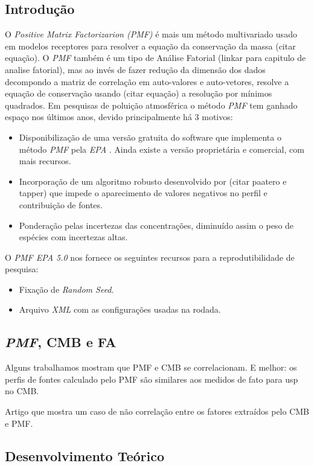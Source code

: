 \subsection{Introdução}
O \textit{Positive Matrix Factorizarion (PMF)} é mais um método multivariado usado em modelos receptores para resolver a equação da conservação da massa (citar equação). O \textit{PMF} também é um tipo de Análise Fatorial (linkar para capitulo de analise fatorial), mas ao invés de fazer redução da dimensão dos dados decompondo a matriz de correlação em auto-valores e auto-vetores, resolve a equação de conservação usando (citar equação) a resolução por mínimos quadrados. Em pesquisas de poluição atmosférica o método \textit{PMF} tem ganhado espaço nos últimos anos, devido principalmente há 3 motivos:

\begin{itemize}
  \item Disponibilização de uma versão gratuita do software que implementa o método \textit{PMF} pela \textit{EPA} \citep{Norris:2014}. Ainda existe a versão proprietária e comercial, com mais recursos.   
  \item Incorporação de um algoritmo robusto desenvolvido por (citar paatero e tapper) que impede o aparecimento de valores negativos no perfil e contribuição de fontes.
  \item Ponderação pelas incertezas das concentrações, diminuído assim o peso de espécies com incertezas altas.
\end{itemize}  

O \textit{PMF EPA 5.0} nos fornece os seguintes recursos para a reprodutibilidade de pesquisa:
\begin{itemize}
  \item Fixação de \textit{Random Seed}.
  \item Arquivo \textit{XML} com as configurações usadas na rodada. 
\end{itemize} 

\subsection{\textit{PMF}, CMB e FA}

Alguns trabalhamos mostram que PMF e CMB se correlacionam. E melhor: os perfis de fontes calculado pelo PMF são similares aos medidos de fato para usp no CMB. 

Artigo que mostra um caso de não correlação entre os fatores extraídos pelo CMB e PMF.

\subsection{Desenvolvimento Teórico} 

